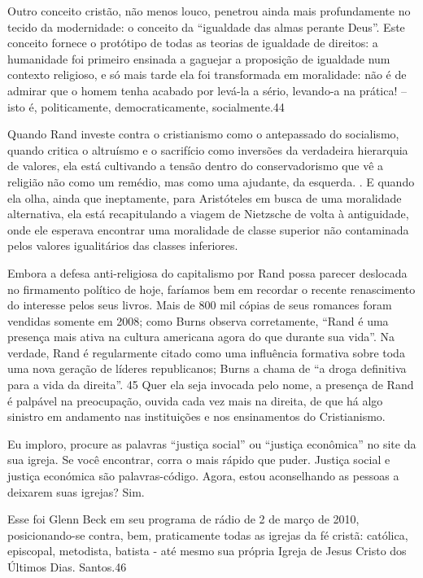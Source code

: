  \par 
Outro conceito cristão, não menos louco, penetrou ainda mais profundamente no tecido da modernidade: o conceito da “igualdade das almas perante Deus”. Este conceito fornece o protótipo de todas as teorias de igualdade de direitos: a humanidade foi primeiro ensinada a gaguejar a proposição de igualdade num contexto religioso, e só mais tarde ela foi transformada em moralidade: não é de admirar que o homem tenha acabado por levá-la a sério, levando-a na prática! – isto é, politicamente, democraticamente, socialmente.{\color{blue}44}
 \par 
Quando Rand investe contra o cristianismo como o antepassado do socialismo, quando critica o altruísmo e o sacrifício como inversões da verdadeira hierarquia de valores, ela está cultivando a tensão dentro do conservadorismo que vê a religião não como um remédio, mas como uma ajudante, da esquerda. . E quando ela olha, ainda que ineptamente, para Aristóteles em busca de uma moralidade alternativa, ela está recapitulando a viagem de Nietzsche de volta à antiguidade, onde ele esperava encontrar uma moralidade de classe superior não contaminada pelos valores igualitários das classes inferiores.
 \par 
Embora a defesa anti-religiosa do capitalismo por Rand possa parecer deslocada no firmamento político de hoje, faríamos bem em recordar o recente renascimento do interesse pelos seus livros. Mais de {\color{blue}800} mil cópias de seus romances foram vendidas somente em 2008; como Burns observa corretamente, “Rand é uma presença mais ativa na cultura americana agora do que durante sua vida”. Na verdade, Rand é regularmente citado como uma influência formativa sobre toda uma nova geração de líderes republicanos; Burns a chama de “a droga definitiva para a vida da direita”. {\color{blue}45} Quer ela seja invocada pelo nome, a presença de Rand é palpável na preocupação, ouvida cada vez mais na direita, de que há algo sinistro em andamento nas instituições e nos ensinamentos do Cristianismo.
 \par 
Eu imploro, procure as palavras “justiça social” ou “justiça econômica” no site da sua igreja. Se você encontrar, corra o mais rápido que puder. Justiça social e justiça económica são palavras-código. Agora, estou aconselhando as pessoas a deixarem suas igrejas? Sim.
 \par 
Esse foi Glenn Beck em seu programa de rádio de {\color{blue}2} de março de 2010, posicionando-se contra, bem, praticamente todas as igrejas da fé cristã: católica, episcopal, metodista, batista - até mesmo sua própria Igreja de Jesus Cristo dos Últimos Dias. Santos.{\color{blue}46}
